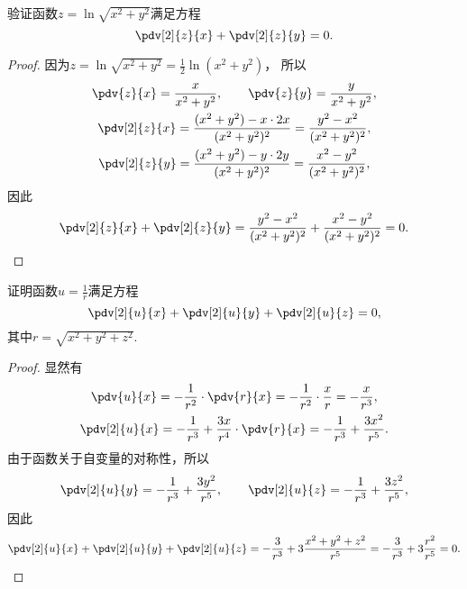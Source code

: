 \begin{example}
验证函数\(z = \ln\sqrt{x^2+y^2}\)满足方程\begin{equation*}
	\pdv[2]{z}{x} + \pdv[2]{z}{y} = 0.
\end{equation*}
\begin{proof}
因为\(z = \ln\sqrt{x^2+y^2} = \frac{1}{2} \ln(x^2+y^2)\)，
所以\begin{gather*}
	\pdv{z}{x} = \frac{x}{x^2+y^2},
	\qquad
	\pdv{z}{y} = \frac{y}{x^2+y^2}, \\
	\pdv[2]{z}{x} = \frac{(x^2+y^2)-x\cdot2x}{(x^2+y^2)^2}
	= \frac{y^2-x^2}{(x^2+y^2)^2}, \\
	\pdv[2]{z}{y} = \frac{(x^2+y^2)-y\cdot2y}{(x^2+y^2)^2}
	= \frac{x^2-y^2}{(x^2+y^2)^2},
\end{gather*}
因此\begin{equation*}
	\pdv[2]{z}{x} + \pdv[2]{z}{y}
	= \frac{y^2-x^2}{(x^2+y^2)^2} + \frac{x^2-y^2}{(x^2+y^2)^2}
	= 0.
	\qedhere
\end{equation*}
\end{proof}
\end{example}

\begin{example}
证明函数\(u = \frac{1}{r}\)满足方程\begin{equation*}
	\pdv[2]{u}{x} + \pdv[2]{u}{y} + \pdv[2]{u}{z} = 0,
\end{equation*}
其中\(r = \sqrt{x^2+y^2+z^2}\).
\begin{proof}
显然有\begin{gather*}
	\pdv{u}{x} = -\frac{1}{r^2}\cdot\pdv{r}{x}
	= -\frac{1}{r^2}\cdot\frac{x}{r}
	= -\frac{x}{r^3}, \\
	\pdv[2]{u}{x} = -\frac{1}{r^3} + \frac{3x}{r^4}\cdot\pdv{r}{x}
	= -\frac{1}{r^3} + \frac{3x^2}{r^5}.
\end{gather*}
由于函数关于自变量的对称性，所以\begin{equation*}
	\pdv[2]{u}{y} = -\frac{1}{r^3} + \frac{3y^2}{r^5},
	\qquad
	\pdv[2]{u}{z} = -\frac{1}{r^3} + \frac{3z^2}{r^5},
\end{equation*}
因此\begin{equation*}
	\pdv[2]{u}{x} + \pdv[2]{u}{y} + \pdv[2]{u}{z}
	= -\frac{3}{r^3} + 3\frac{x^2+y^2+z^2}{r^5}
	= -\frac{3}{r^3} + 3\frac{r^2}{r^5} = 0.
	\qedhere
\end{equation*}
\end{proof}
\end{example}

